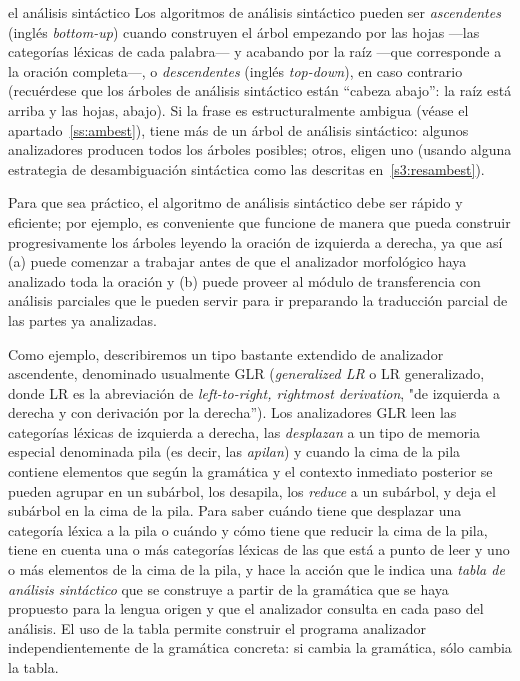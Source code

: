 \begin{persabermes}{el análisis sintáctico} Los algoritmos de análisis sintáctico pueden ser {\em ascendentes} (inglés \emph{bottom-up}) cuando construyen el árbol empezando por las hojas ---las categorías léxicas de cada palabra--- y acabando por la raíz ---que corresponde a la oración completa---, o \emph{descendentes} (inglés \emph{top-down}), en caso contrario (recuérdese que los árboles de análisis sintáctico están ``cabeza abajo'': la raíz está arriba y las hojas, abajo). Si la frase es estructuralmente ambigua (véase el apartado~\ref{ss:ambest}), tiene más de un árbol de análisis sintáctico: algunos analizadores producen todos los árboles posibles; otros, eligen uno (usando alguna estrategia de desambiguación sintáctica como las descritas en~\ref{s3:resambest}). 

Para que sea práctico, el algoritmo de análisis sintáctico debe ser rápido y eficiente; por ejemplo, es conveniente que funcione de manera que pueda construir progresivamente los árboles leyendo la oración de izquierda a derecha, ya que así (a) puede comenzar a trabajar antes de que el analizador morfológico haya analizado toda la oración y (b) puede proveer al módulo de transferencia con análisis parciales que le pueden servir para ir preparando la traducción parcial de las partes ya analizadas. 

Como ejemplo, describiremos un tipo bastante extendido de analizador ascendente, denominado usualmente GLR (\emph{generalized LR} o LR generalizado, donde LR es la abreviación de \emph{left-to-right, rightmost derivation}, "de izquierda a derecha y con derivación por la derecha''). Los analizadores GLR leen las categorías léxicas de izquierda a derecha, las \emph{desplazan} a un tipo de memoria especial denominada pila (es decir, las \emph{apilan}) y cuando la cima de la pila contiene elementos que según la gramática y el contexto inmediato posterior se pueden agrupar en un subárbol, los desapila, los \emph{reduce} a un subárbol, y deja el subárbol en la cima de la pila. Para saber cuándo tiene que desplazar una categoría léxica a la pila o cuándo y cómo tiene que reducir la cima de la pila, tiene en cuenta una o más categorías léxicas de las que está a punto de leer y uno o más elementos de la cima de la pila, y hace la acción que le indica una \emph{tabla de análisis sintáctico} que se construye a partir de la gramática que se haya propuesto para la lengua origen y que el analizador consulta en cada paso del análisis. El uso de la tabla permite construir el programa analizador independientemente de la gramática concreta: si cambia la gramática, sólo cambia la tabla. 


\end{persabermes}
